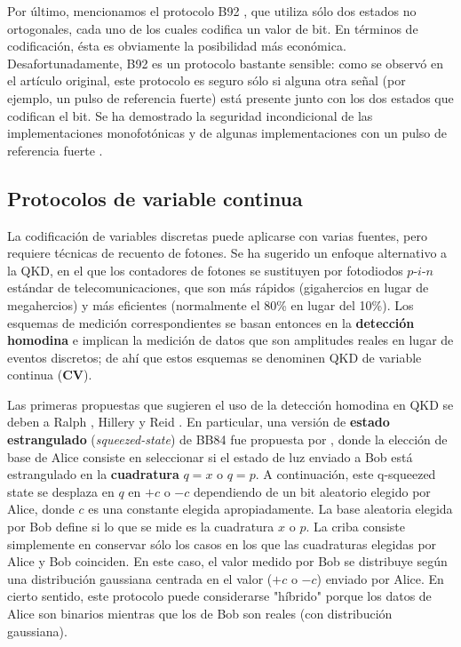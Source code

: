 \documentclass[a4paper,11pt]{book} %
\numberwithin{equation}{chapter}
\begin{document}
Por último, mencionamos el protocolo B92 \cite{B92}, que utiliza sólo dos estados no ortogonales, cada uno de los cuales codifica un valor de bit. En términos de codificación, ésta es obviamente la posibilidad más económica. Desafortunadamente, B92 es un protocolo bastante sensible: como se observó en el artículo original, este protocolo es seguro sólo si alguna otra señal (por ejemplo, un pulso de referencia fuerte) está presente junto con los dos estados que codifican el bit. Se ha demostrado la seguridad incondicional de las implementaciones monofotónicas \cite{B92_proof_1,B92_proof_2} y de algunas implementaciones con un pulso de referencia fuerte \cite{B92_proof_3,B92_proof_4}. 




		\subsection{Protocolos de variable continua} \label{subsec_QKD_continua}
		
La codificación de variables discretas puede aplicarse con varias fuentes, pero requiere técnicas de recuento de fotones. Se ha sugerido un enfoque alternativo a la QKD, en el que los contadores de fotones se sustituyen por fotodiodos $p$-$i$-$n$ estándar de telecomunicaciones, que son más rápidos (gigahercios en lugar de megahercios) y más eficientes (normalmente el 80\% en lugar del 10\%). Los esquemas de medición correspondientes se basan entonces en la \textbf{detección homodina} e implican la medición de datos que son amplitudes reales en lugar de eventos discretos; de ahí que estos esquemas se denominen QKD de variable continua (\textbf{CV}).

Las primeras propuestas que sugieren el uso de la detección homodina en QKD se deben a Ralph \cite{Continue_var_Ralph_1999}, Hillery \cite{Continue_var_Hillery_2000} y Reid \cite{Continue_var_Reid_2000}. En particular, una versión de \textbf{estado estrangulado} (\textit{squeezed-state}) de BB84 fue propuesta por \cite{Continue_var_Hillery_2000}, donde la elección de base de Alice consiste en seleccionar si el estado de luz enviado a Bob está estrangulado en la \textbf{cuadratura} $q = x$ o $q = p$. A continuación, este q-squeezed state se desplaza en $q$ en $+c$ o $-c$ dependiendo de un bit aleatorio elegido por Alice, donde $c$ es una constante elegida apropiadamente. La base aleatoria elegida por Bob define si lo que se mide es la cuadratura $x$ o $p$. La criba consiste simplemente en conservar sólo los casos en los que las cuadraturas elegidas por Alice y Bob coinciden. En este caso, el valor medido por Bob se distribuye según una distribución gaussiana centrada en el valor ($+c$ o $-c$) enviado por Alice. En cierto sentido, este protocolo puede considerarse "híbrido" porque los datos de Alice son binarios mientras que los de Bob son reales (con distribución gaussiana).
\end{document}
